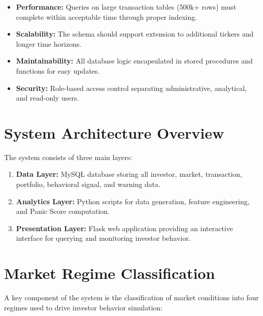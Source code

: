 \begin{itemize}
    \item \textbf{Performance:} Queries on large transaction tables (500k+ rows) must complete within acceptable time through proper indexing.
    \item \textbf{Scalability:} The schema should support extension to additional tickers and longer time horizons.
    \item \textbf{Maintainability:} All database logic encapsulated in stored procedures and functions for easy updates.
    \item \textbf{Security:} Role-based access control separating administrative, analytical, and read-only users.
\end{itemize}

\section{System Architecture Overview}


The system consists of three main layers:

\begin{enumerate}
    \item \textbf{Data Layer:} MySQL database storing all investor, market, transaction, portfolio, behavioral signal, and warning data.
    \item \textbf{Analytics Layer:} Python scripts for data generation, feature engineering, and Panic Score computation.
    \item \textbf{Presentation Layer:} Flask web application providing an interactive interface for querying and monitoring investor behavior.
\end{enumerate}

\section{Market Regime Classification}

A key component of the system is the classification of market conditions into four regimes used to drive investor behavior simulation:

